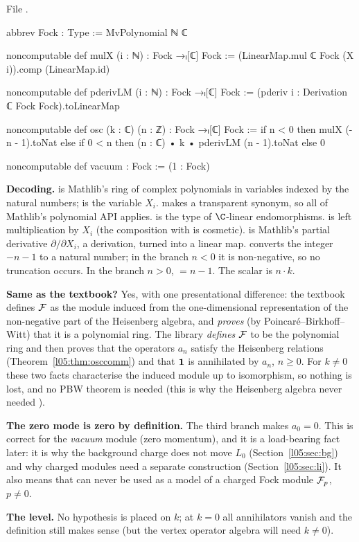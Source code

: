 \noindent File .
\begin{leancode}
abbrev Fock : Type := MvPolynomial ℕ ℂ

noncomputable def mulX (i : ℕ) : Fock →ₗ[ℂ] Fock :=
  (LinearMap.mul ℂ Fock (X i)).comp (LinearMap.id)

noncomputable def pderivLM (i : ℕ) : Fock →ₗ[ℂ] Fock :=
  (pderiv i : Derivation ℂ Fock Fock).toLinearMap

noncomputable def osc (k : ℂ) (n : ℤ) : Fock →ₗ[ℂ] Fock :=
  if n < 0 then mulX (-n - 1).toNat
  else if 0 < n then (n : ℂ) • k • pderivLM (n - 1).toNat
  else 0

noncomputable def vacuum : Fock := (1 : Fock)
\end{leancode}

\begin{dictionary}
\textbf{Decoding.}  is Mathlib's ring of complex polynomials in variables
indexed by the natural numbers;  is the variable $X_i$.  makes  a
transparent synonym, so all of Mathlib's polynomial API applies.  is the type of
$\C$-linear endomorphisms.  is left multiplication by $X_i$ (the
composition with  is cosmetic).  is Mathlib's partial derivative
$\partial/\partial X_i$, a derivation, turned into a linear map.  converts the
integer $-n-1$ to a natural number; in the branch $n<0$ it is non-negative, so no truncation occurs.
In the branch $n>0$,  $=n-1$. The scalar is $n\cdot k$.

\textbf{Same as the textbook?} Yes, with one presentational difference: the textbook defines $\mathcal{F}$ as
the module induced from the one-dimensional representation of the non-negative part of the
Heisenberg algebra, and \emph{proves} (by Poincar\'e--Birkhoff--Witt) that it is a polynomial ring. The
library \emph{defines} $\mathcal{F}$ to be the polynomial ring and then proves that the operators $a_n$
satisfy the Heisenberg relations (Theorem~\ref{l05:thm:osccomm}) and that $\mathbf{1}$ is annihilated by
$a_n$, $n\ge0$. For $k\neq0$ these two facts characterise the induced module up to isomorphism, so
nothing is lost, and no PBW theorem is needed (this is why the Heisenberg algebra never needed
).

\textbf{The zero mode is zero by definition.} The third branch makes $a_0=0$. This is correct for the
\emph{vacuum} module (zero momentum), and it is a load-bearing fact later: it is why the background
charge does not move $L_0$ (Section~\ref{l05:sec:bg}) and why charged modules need a separate
construction (Section~\ref{l05:sec:li}). It also means that  can never be used as a model of a
charged Fock module $\mathcal{F}_p$, $p\neq0$.

\textbf{The level.} No hypothesis is placed on $k$; at $k=0$ all annihilators vanish and the
definition still makes sense (but the vertex operator algebra will need $k\neq0$).
\end{dictionary}

